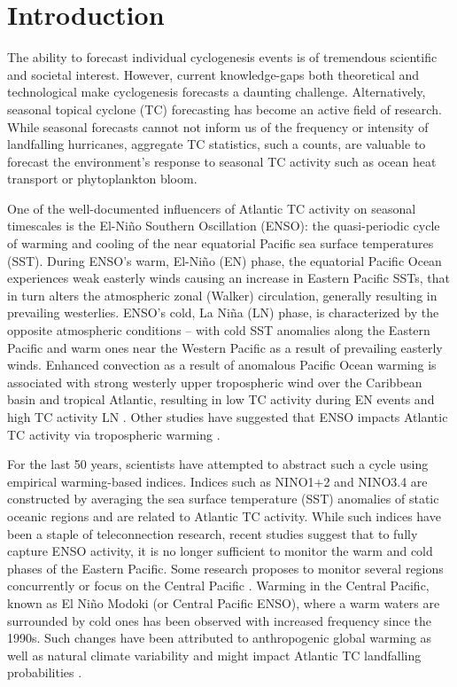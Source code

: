 \section{Introduction}
The ability to forecast individual cyclogenesis events is of tremendous scientific and societal interest. However, current knowledge-gaps both theoretical and technological make cyclogenesis forecasts a daunting challenge. Alternatively, seasonal topical cyclone (TC) forecasting has become an active field of research. While seasonal forecasts cannot not inform us of the frequency or intensity of landfalling hurricanes, aggregate TC statistics, such a counts, are valuable to forecast the environment's response to seasonal TC activity such as ocean heat transport or phytoplankton bloom.

One of the well-documented influencers of Atlantic TC activity on seasonal timescales is the El-Ni\~no Southern Oscillation (ENSO): the quasi-periodic cycle of warming and cooling of the near equatorial Pacific sea surface temperatures (SST). During ENSO's warm, El-Ni\~no (EN) phase, the equatorial Pacific Ocean experiences weak easterly winds causing an increase in Eastern Pacific SSTs, that in turn alters the atmospheric zonal (Walker) circulation, generally resulting in prevailing westerlies. ENSO's cold, La Ni\~na (LN) phase, is characterized by the opposite atmospheric conditions -- with cold SST anomalies along the Eastern Pacific and warm ones near the Western Pacific as a result of prevailing easterly winds. Enhanced convection as a result of anomalous Pacific Ocean warming is associated with strong westerly upper tropospheric wind over the Caribbean basin and tropical Atlantic, resulting in low TC activity during EN events and high TC activity LN \cite{gray1984a}. Other studies have suggested that ENSO impacts Atlantic TC activity via tropospheric warming \cite{tang2004}. %

For the last 50 years, scientists have attempted to abstract such a cycle using empirical warming-based indices. Indices such as NINO1+2 and NINO3.4 are constructed by averaging the sea surface temperature (SST) anomalies of static oceanic regions and are related to Atlantic TC activity. While such indices have been a staple of teleconnection research, recent studies suggest that to fully capture ENSO activity, it is no longer sufficient to monitor the warm and cold phases of the Eastern Pacific. Some research proposes to monitor several regions concurrently \cite{trenberth2001,ren2011} or focus on the Central Pacific \cite{ashok2007}. Warming in the Central Pacific, known as El Ni\~no Modoki (or Central Pacific ENSO), where a warm waters are surrounded by cold ones has been observed with increased frequency since the 1990s. Such changes have been attributed to anthropogenic global warming \cite{yeh2009} as well as natural climate variability \cite{wittenberg2009} and might impact Atlantic TC landfalling probabilities \cite{kim2009}.
% 

